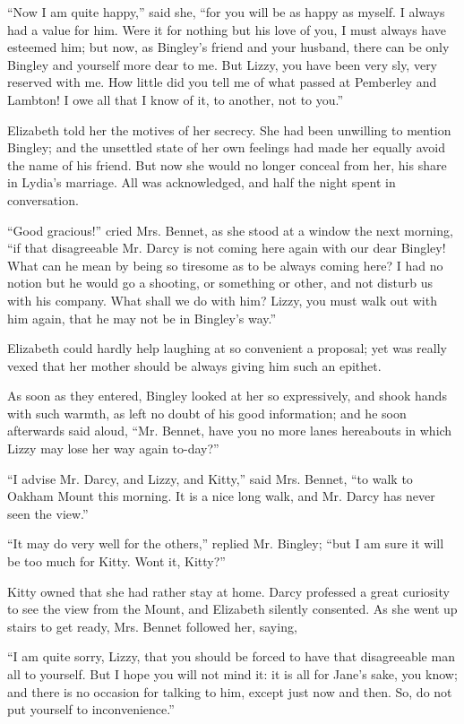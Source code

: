 “Now I am quite happy,” said she, “for you will be as
happy as myself. I always had a value for him. Were
it for nothing but his love of you, I must always have
esteemed him; but now, as Bingley’s friend and your
husband, there can be only Bingley and yourself more
dear to me. But Lizzy, you have been very sly, very
reserved with me. How little did you tell me of what
passed at Pemberley and Lambton! I owe all that
I know of it, to another, not to you.”

Elizabeth told her the motives of her secrecy. She had
been unwilling to mention Bingley; and the unsettled
state of her own feelings had made her equally avoid the
name of his friend. But now she would no longer conceal
from her, his share in Lydia’s marriage. All was acknowledged,
and half the night spent in conversation.

\strut

“Good gracious!” cried Mrs. Bennet, as she stood at
a window the next morning, “if that disagreeable Mr.
Darcy is not coming here again with our dear Bingley!
What can he mean by being so tiresome as to be always
coming here? I had no notion but he would go a shooting,
or something or other, and not disturb us with his company.
What shall we do with him? Lizzy, you must
walk out with him again, that he may not be in Bingley’s
way.”

Elizabeth could hardly help laughing at so convenient
a proposal; yet was really vexed that her mother should
be always giving him such an epithet.

As soon as they entered, Bingley looked at her so
expressively, and shook hands with such warmth, as left
no doubt of his good information; and he soon afterwards
said aloud, “Mr. Bennet, have you no more lanes hereabouts
in which Lizzy may lose her way again to-day?”

“I advise Mr. Darcy, and Lizzy, and Kitty,” said
Mrs. Bennet, “to walk to Oakham Mount this morning.
It is a nice long walk, and Mr. Darcy has never seen the
view.”

“It may do very well for the others,” replied Mr.
Bingley; “but I am sure it will be too much for Kitty.
Wont it, Kitty?”

Kitty owned that she had rather stay at home. Darcy
professed a great curiosity to see the view from the Mount,
and Elizabeth silently consented. As she went up stairs
to get ready, Mrs. Bennet followed her, saying,

“I am quite sorry, Lizzy, that you should be forced
to have that disagreeable man all to yourself. But I hope
you will not mind it: it is all for Jane’s sake, you know;
and there is no occasion for talking to him, except just
now and then. So, do not put yourself to inconvenience.”

